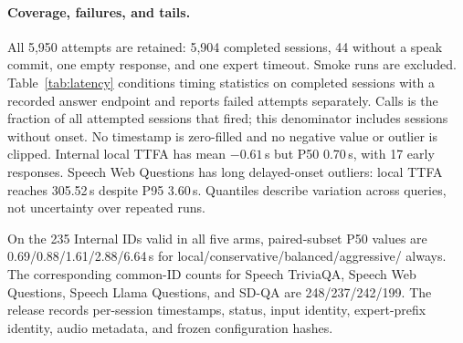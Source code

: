 \paragraph{Coverage, failures, and tails.}
All 5,950 attempts are retained: 5,904 completed sessions, 44 without a
speak commit, one empty response, and one expert timeout. Smoke runs are
excluded. Table~\ref{tab:latency} conditions timing statistics on completed
sessions with a recorded answer endpoint and reports failed attempts
separately. Calls is the fraction of all attempted sessions that fired;
this denominator includes sessions without onset. No timestamp is
zero-filled and no negative value or outlier is clipped. Internal local
TTFA has mean $-0.61$\,s but P50 0.70\,s, with 17 early responses.
Speech Web Questions has long delayed-onset outliers: local TTFA reaches
305.52\,s despite P95 3.60\,s. Quantiles describe variation across queries,
not uncertainty over repeated runs.

On the 235 Internal IDs valid in all five arms, paired-subset P50 values
are 0.69/0.88/1.61/2.88/6.64\,s for local/conservative/balanced/aggressive/
always. The corresponding common-ID counts for Speech TriviaQA, Speech
Web Questions, Speech Llama Questions, and SD-QA are 248/237/242/199.
The release records per-session timestamps, status, input identity,
expert-prefix identity, audio metadata, and frozen configuration hashes.


